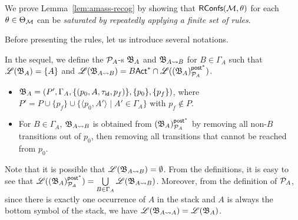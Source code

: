     
    
We prove Lemma~\ref{lem:amass-recog} by showing that $\mathsf{RConfs}({\mathcal{M} }, \theta)$ for each $\theta \in \Theta_{\mathcal{M} }$ can be \emph{saturated by repeatedly applying a finite set of rules}. 

Before presenting the rules, let us introduce several notations. 

In the sequel, we define the ${\mathcal{P} }_{A}$-{\WOTrNFA}s ${\mathfrak{B} }_{A}$ and ${\mathfrak{B} }_{A\rightsquigarrow B}$ for $B \in \Gamma_A$ such that ${\mathscr{L} }({\mathfrak{B} }_A) = \{A\}$ and ${\mathscr{L} }({\mathfrak{B} }_{A\rightsquigarrow B}) =B{\sf Act}^* \cap {\mathscr{L} }(({\mathfrak{B} }_{A})^{{\mathsf{post} }^*}_{{\mathcal{P} }_A})$. 
\begin{itemize}
    \item ${\mathfrak{B} }_{A} = (P', \Gamma_A, \{(p_0, A,\tau_{\mathsf{id}}, p_f)\},\{p_0\},\{p_f\} )$, where $P' = P \cup \{p_f\} \cup \{\langle p_0,A'\rangle \mid A'\in\Gamma_A\}$ with $p_f \not \in P$.  
    \item For $B \in \Gamma_A$, ${\mathfrak{B} }_{A\rightsquigarrow B}$ is obtained from $({\mathfrak{B} }_{A})^{{\mathsf{post} }^*}_{{\mathcal{P} }_A}$ by removing all non-$B$ transitions out of $p_0$, then removing all transitions that cannot be reached from $p_0$. 
\end{itemize}
Note that it is possible that ${\mathscr{L} }({\mathfrak{B} }_{A\rightsquigarrow B}) = \emptyset$.
From the definitions, it is easy to see that ${\mathscr{L} }(({\mathfrak{B} }_A)^{{\mathsf{post} }^*}_{{\mathcal{P} }_A}) = \bigcup\limits_{B\in\Gamma_A} {\mathscr{L} }({\mathfrak{B} }_{A\rightsquigarrow B})$. Moreover, from the definition of ${\mathcal{P} }_A$, since there is exactly one occurrence of $A$ in the stack and $A$ is always the bottom symbol of the stack, we have ${\mathscr{L} }({\mathfrak{B} }_{A\rightsquigarrow A}) = {\mathscr{L} }({\mathfrak{B} }_A)$. 

